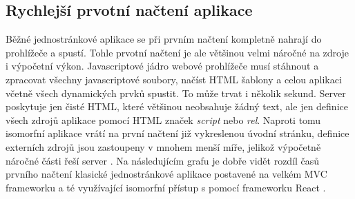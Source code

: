 \subsection{Rychlejší prvotní načtení aplikace}
Běžné jednostránkové aplikace se při prvním načtení kompletně nahrají do prohlížeče a spustí. Tohle prvotní načtení je ale většinou velmi náročné na zdroje i výpočetní výkon. Javascriptové jádro webové prohlížeče musí stáhnout a zpracovat všechny javascriptové soubory, načíst HTML šablony a celou aplikaci včetně všech dynamických prvků spustit. To může trvat i několik sekund. Server poskytuje jen čisté HTML, které většinou neobsahuje žádný text, ale jen definice všech zdrojů aplikace pomocí HTML značek \textit{script} nebo \textit{rel}. Naproti tomu isomorfní aplikace vrátí na první načtení již vykreslenou úvodní stránku, definice externích zdrojů jsou zastoupeny v mnohem menší míře, jelikož výpočetně náročné části řeší server \cite{isomorhic_book} \cite{codepicnic_universaljs}. Na následujícím grafu je dobře vidět rozdíl časů prvního načtení klasické jednostránkové aplikace postavené na velkém MVC frameworku a té využívající isomorfní přístup s pomocí frameworku React \cite{spa_perf}. 
